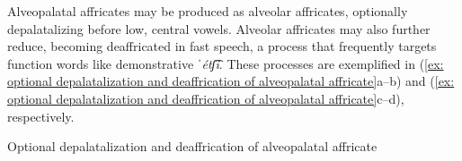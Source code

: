 Alveopalatal affricates may be produced as alveolar affricates, optionally depalatalizing before low, central vowels. Alveolar affricates may also further reduce, becoming deaffricated in fast speech, a process that frequently targets function words like demonstrative \textit{ˈétʃ͡i}. These processes are exemplified in (\ref{ex: optional depalatalization and deaffrication of alveopalatal affricate}a--b) and (\ref{ex: optional depalatalization and deaffrication of alveopalatal affricate}c--d), respectively.

\break

\ea\label{ex: optional depalatalization and deaffrication of alveopalatal affricate}
{Optional depalatalization and deaffrication of alveopalatal affricate}

    \z
\z

